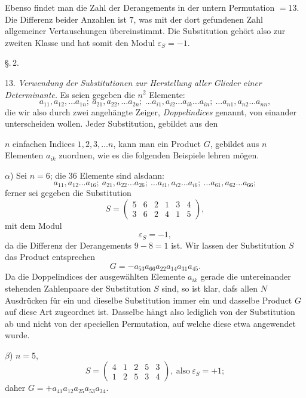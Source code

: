 \documentclass[11pt]{article}
\providecommand{\gesperrt}[1]{\textls[130]{#1}}
\providecommand{\weberpage}[1]{}
\begin{document}
Ebenso findet man die Zahl der Derangements in der untern Permutation $= 13$. %
Die Differenz beider Anzahlen ist $7$, was mit der dort gefundenen Zahl allgemeiner Vertauschungen übereinstimmt. Die Substitution gehört also zur zweiten Klasse und hat somit den Modul $\varepsilon_S = -1$.

\begin{center}
\S.\,2.\\
\gesperrt{Begriff der Determinanten.}
\end{center}

13. \textit{Verwendung der Substitutionen zur Herstellung aller Glieder einer Determinante.} Es seien gegeben die $n^2$ Elemente:
\[
a_{11}, a_{12}, \ldots a_{1n}; \ a_{21}, a_{22}, \ldots a_{2n}; \ \ldots a_{i1}, a_{i2} \ldots a_{ik} \ldots a_{in}; \ \ldots a_{n1}, a_{n2} \ldots a_{nn},
\]
die wir also durch zwei angehängte Zeiger, \textit{Doppelindices} genannt, von einander unterscheiden wollen. Jeder Substitution, gebildet aus den


\weberpage{16}
$n$ einfachen Indices $1, 2, 3, \ldots n$, kann man ein Product $G$, gebildet aus $n$ Elementen $a_{ik}$ zuordnen, wie es die folgenden Beispiele lehren mögen.

$\alpha$) Sei $n = 6$; die 36 Elemente sind alsdann:
\[
a_{11}, a_{12} \ldots a_{16}; \ a_{21}, a_{22} \ldots a_{26}; \ \ldots a_{i1}, a_{i2} \ldots a_{i6}; \ \ldots a_{61}, a_{62} \ldots a_{66};
\]
ferner sei gegeben die Substitution
\[
S = \begin{pmatrix} 5 & 6 & 2 & 1 & 3 & 4 \\ 3 & 6 & 2 & 4 & 1 & 5 \end{pmatrix},
\]
mit dem Modul
\[
\varepsilon_S = -1,
\]
da die Differenz der Derangements $9 - 8 = 1$ ist. Wir lassen der Substitution $S$ das Product entsprechen
\[
G = -a_{53} a_{66} a_{22} a_{14} a_{31} a_{45}.
\]
Da die Doppelindices der ausgewählten Elemente $a_{ik}$ gerade die untereinander stehenden Zahlenpaare der Substitution $S$ sind, so ist klar, dafs allen $N$ Ausdrücken für ein und dieselbe Substitution immer ein und dasselbe Product $G$ auf diese Art zugeordnet ist. Dasselbe hängt also lediglich von der Substitution ab und nicht von der speciellen Permutation, auf welche diese etwa angewendet wurde.

$\beta$) $n = 5$,
\[
S = \begin{pmatrix} 4 & 1 & 2 & 5 & 3 \\ 1 & 2 & 5 & 3 & 4 \end{pmatrix}, \ \text{also} \ \varepsilon_S = +1;
\]
daher $G = +a_{41} a_{12} a_{25} a_{53} a_{34}$.
\end{document}
